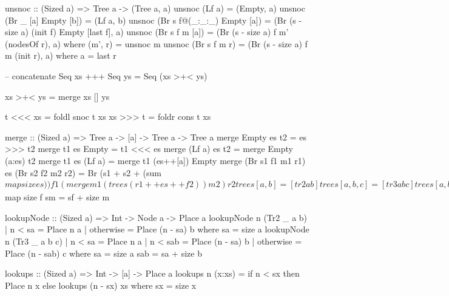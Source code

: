 \documentclass[b5paper]{article}
\begin{document}
\begin{Haskell}
unsnoc :: (Sized a) => Tree a -> (Tree a, a)
unsnoc (Lf a) = (Empty, a)
unsnoc (Br _ [a] Empty [b]) = (Lf a, b)
unsnoc (Br s f@(_:_:_) Empty [a]) = (Br (s - size a) (init f) Empty [last f], a)
unsnoc (Br s f m [a]) = (Br (s - size a) f m' (nodesOf r), a)
    where (m', r) = unsnoc m
unsnoc (Br s f m r) = (Br (s - size a) f m (init r), a) where a = last r

-- concatenate
Seq xs +++ Seq ys = Seq (xs >+< ys)

xs >+< ys = merge xs [] ys

t <<< xs = foldl snoc t xs
xs >>> t = foldr cons t xs

merge :: (Sized a) => Tree a -> [a] -> Tree a -> Tree a
merge Empty es t2 = es >>> t2
merge t1 es Empty = t1 <<< es
merge (Lf a) es t2 = merge Empty (a:es) t2
merge t1 es (Lf a) = merge t1 (es++[a]) Empty
merge (Br s1 f1 m1 r1) es (Br s2 f2 m2 r2) =
    Br (s1 + s2 + (sum $ map size es)) f1 (merge m1 (trees (r1 ++ es ++ f2)) m2) r2

trees [a, b] = [tr2 a b]
trees [a, b, c] = [tr3 a b c]
trees [a, b, c, d] = [tr2 a b, tr2 c d]
trees (a:b:c:es) = (tr3 a b c):trees es

-- index
data Place a = Place Int a

getAt :: Seq a -> Int -> Maybe a
getAt (Seq xs) i | i < size xs = case lookupTree i xs of
                     Place _ (Elem x) -> Just x
                 | otherwise = Nothing

lookupTree :: (Sized a) => Int -> Tree a -> Place a
lookupTree n (Lf a) = Place n a
lookupTree n (Br s f m r) | n < sf = lookups n f
                          | n < sm = case lookupTree (n - sf) m of
                                            Place n' xs -> lookupNode n' xs
                          | n < s = lookups (n - sm) r
  where sf = sum $ map size f
        sm = sf + size m

lookupNode :: (Sized a) => Int -> Node a -> Place a
lookupNode n (Tr2 _ a b) | n < sa = Place n a
                         | otherwise = Place (n - sa) b
  where sa = size a
lookupNode n (Tr3 _ a b c) | n < sa = Place n a
                           | n < sab = Place (n - sa) b
                           | otherwise = Place (n - sab) c
  where sa = size a
        sab = sa + size b

lookups :: (Sized a) => Int -> [a] -> Place a
lookups n (x:xs) = if n < sx then Place n x
                   else lookups (n - sx) xs
  where sx = size x
\end{Haskell}

\ifx\wholebook\relax \else
\end{document}
